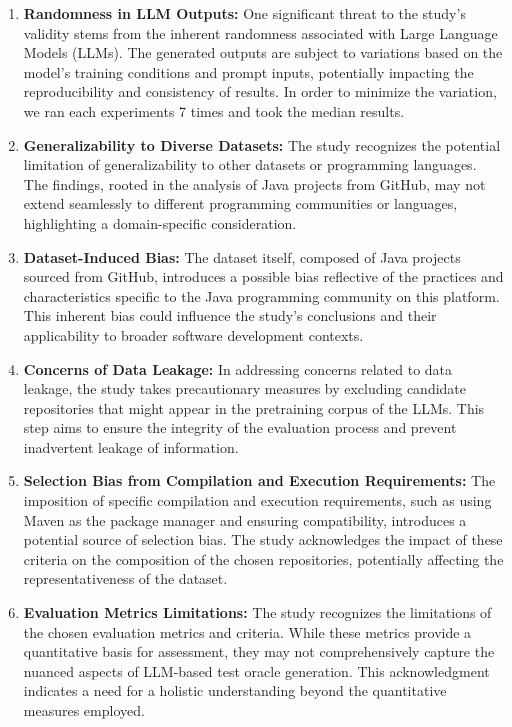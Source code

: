 \begin{enumerate}
    \item \textbf{Randomness in LLM Outputs:} One significant threat to the study's validity stems from the inherent randomness associated with Large Language Models (LLMs). The generated outputs are subject to variations based on the model's training conditions and prompt inputs, potentially impacting the reproducibility and consistency of results. In order to minimize the variation, we ran each experiments 7 times and took the median results.

    \item \textbf{Generalizability to Diverse Datasets:} The study recognizes the potential limitation of generalizability to other datasets or programming languages. The findings, rooted in the analysis of Java projects from GitHub, may not extend seamlessly to different programming communities or languages, highlighting a domain-specific consideration.

    \item \textbf{Dataset-Induced Bias:} The dataset itself, composed of Java projects sourced from GitHub, introduces a possible bias reflective of the practices and characteristics specific to the Java programming community on this platform. This inherent bias could influence the study's conclusions and their applicability to broader software development contexts.

    \item \textbf{Concerns of Data Leakage:} In addressing concerns related to data leakage, the study takes precautionary measures by excluding candidate repositories that might appear in the pretraining corpus of the LLMs. This step aims to ensure the integrity of the evaluation process and prevent inadvertent leakage of information.

    \item \textbf{Selection Bias from Compilation and Execution Requirements:} The imposition of specific compilation and execution requirements, such as using Maven as the package manager and ensuring compatibility, introduces a potential source of selection bias. The study acknowledges the impact of these criteria on the composition of the chosen repositories, potentially affecting the representativeness of the dataset.

    \item \textbf{Evaluation Metrics Limitations:} The study recognizes the limitations of the chosen evaluation metrics and criteria. While these metrics provide a quantitative basis for assessment, they may not comprehensively capture the nuanced aspects of LLM-based test oracle generation. This acknowledgment indicates a need for a holistic understanding beyond the quantitative measures employed.
\end{enumerate}


